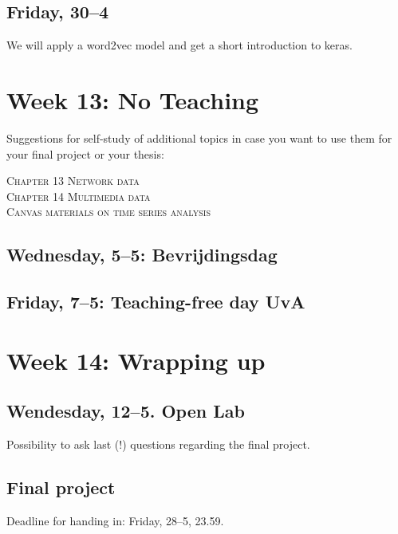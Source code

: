 \subsection*{Friday, 30--4}
We will apply a word2vec model and get a short introduction to keras.



\section*{Week 13: No Teaching}
Suggestions for self-study of additional topics in case you want to use them for your final project or your thesis:

\noindent \textsc{ Chapter 13 Network data}\\
\textsc{ Chapter 14 Multimedia data}\\
\textsc{ Canvas materials on time series analysis}\\

\subsection*{Wednesday, 5--5: Bevrijdingsdag}
\subsection*{Friday, 7--5: Teaching-free day UvA}


\section*{Week 14: Wrapping up}

\subsection*{Wendesday, 12--5. Open Lab}
Possibility to ask last (!) questions regarding the final project.


\subsection*{Final project}
Deadline for handing in: Friday, 28--5, 23.59.
